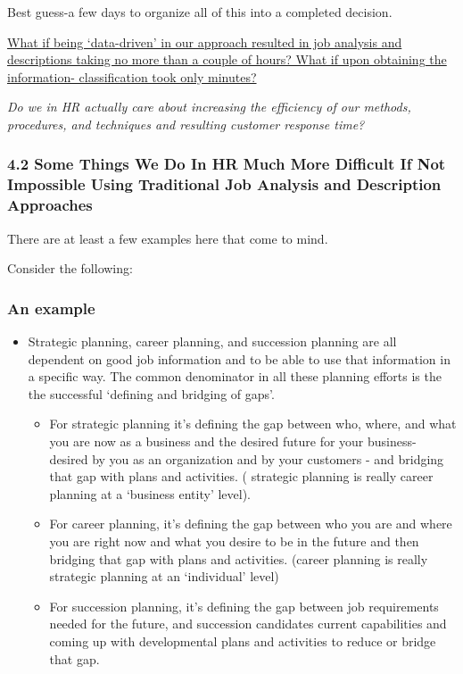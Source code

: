 \documentclass[12pt,letterpaper]{article}
\begin{document}
{{{Best guess-a few days to organize all of this into a completed decision.

\ul{What if being `data-driven' in our approach resulted in job analysis
and descriptions taking no more than a couple of hours? What if upon
obtaining the information- classification took only minutes?}

\emph{Do we in HR actually care about increasing the efficiency of our
methods, procedures, and techniques and resulting customer response
time?}

\subsubsection{4.2 Some Things We Do In HR Much More Difficult If Not
Impossible Using Traditional Job Analysis and Description
Approaches}

There are at least a few examples here that come to mind.

Consider the following:

\subsubsection{An example}\label{an-example}

\begin{itemize}
\item
  Strategic planning, career planning, and succession planning are all
  dependent on good job information and to be able to use that
  information in a specific way. The common denominator in all these
  planning efforts is the the successful `defining and bridging of
  gaps'.

  \begin{itemize}
  \item
    For strategic planning it's defining the gap between who, where, and
    what you are now as a business and the desired future for your
    business- desired by you as an organization and by your customers -
    and bridging that gap with plans and activities. ( strategic
    planning is really career planning at a `business entity' level).
  \item
    For career planning, it's defining the gap between who you are and
    where you are right now and what you desire to be in the future and
    then bridging that gap with plans and activities. (career planning
    is really strategic planning at an `individual' level)
  \item
    For succession planning, it's defining the gap between job
    requirements needed for the future, and succession candidates
    current capabilities and coming up with developmental plans and
    activities to reduce or bridge that gap.
  \end{itemize}
\end{itemize}

}}}
\end{document}
